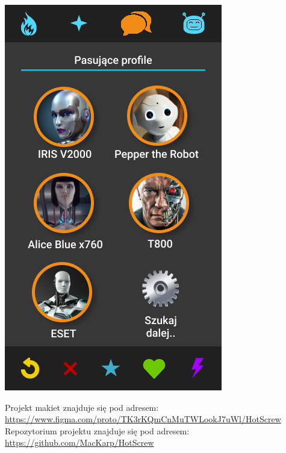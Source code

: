 \documentclass[12pt,a4paper]{article}
\begin{document}
\begin{center}
		\includegraphics[width=0.6\linewidth]{img/Android2.png}
	\end{center}
	Projekt makiet znajduje się pod adresem: \\ \url{https://www.figma.com/proto/TK3rKQmCnMuTWLookJ7uWl/HotScrew}\\
	Repozytorium projektu znajduje się pod adresem: \\ \url{https://github.com/MacKarp/HotScrew}
		\newpage
\end{document}

